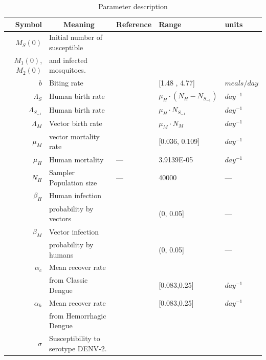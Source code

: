\begin{table}[htb]
	\begin{center}
		\begin{tabular}{rllll}
			\toprule
			Symbol		&	\multicolumn{1}{c}{Meaning} &
				Reference	& Range & units
		\\
		\midrule
			$M_S(0)$
				& Initial number of susceptible
		\\
			$M_1(0)$, $M_2(0)$
				& and infected mosquitoes.
		\\
			$b$
			& Biting rate
			&\cite{YasunoM1990}
			&[1.48 , 4.77] & $\si{meals \per day}$ 
		\\
			$\Lambda_S$
				& Human birth rate
				&
				& 
					$\mu_H \cdot (N_H - N_{S_{-1}})$
				& $\si{day^{-1}}$
		\\
			$\Lambda_{S_{-1}}$
				& Human birth rate
				&
				& 
					$\mu_H \cdot N_{S_{-1}}$
				& $\si{day^{-1}}$
		\\
			$\Lambda_M$
			& Vector birth rate
			&
			& $\mu_M \cdot N_M$
			& $\si{day^{-1}}$
		\\
			$\mu_M$
			& vector mortality rate
			& \cite{YANG2009}
      & [\num{0.036}, \num{0.109}] 
      & $\si{day^{-1}}$
    \\
			$\mu_H$
			& Human mortality
			&---
			& \num{3.9139E-05} 
			& $\si{day^{-1}}$
		\\
			$N_H$   
			& Sampler Population size  
			&---
			&\num{40000}
			&---	
		\\
			$\beta_H$ 
			&	Human infection 
			\\
      & probability  by vectors
			& \cite{Feng1997a} 
			& (\num{0}, \num{0.05}] 
			& ---
		\\
			$\beta_M$
			& Vector infection 
			\\
      & probability by humans
			& \cite{Feng1997a}& (\num{0}, \num{0.05}] & ---
		\\
			$\alpha_{c}$ 
			& Mean recover rate 
			\\
      & from Classic Dengue
			&\cite{Pinho2010}
			& [\num{0.083},\num{0.25}] & $\si{day^{-1}}$
		\\
			$\alpha_{h}$	& Mean recover rate
			& \cite{Pinho2010} 
			& [\num{0.083},\num{0.25}] 
			& $\si{day^{-1}}$
		\\
			& from Hemorrhagic Dengue
		\\
			$\sigma$
			& Susceptibility to serotype \ac{DENV-2}.
			& \cite{Feng1997a}
      \\
			\bottomrule
		\end{tabular}
	\end{center}
	\caption{Parameter description}
	\label{tbl:parameter_description}
\end{table}
